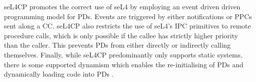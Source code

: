 seL4CP promotes the correct use of seL4 by employing an event driven driven programming model for PDs. Events are triggered by
either notifications or PPCs sent along a CC. seL4CP also restricts the use of seL4's IPC primitives to remote procedure calls,
which is only possible if the callee has strictly higher priority than the caller. This prevents PDs from either directly or 
indirectly calling themselves. Finally, while seL4CP predominantly only supports static systems, there is 
some supported dynamism which enables the re-initialising of PDs and dynamically loading code into PDs \cite{Heiser_PCVL_22}.
